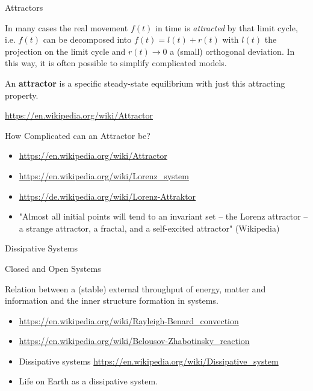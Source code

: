 \documentclass{beamer}
\begin{document}
\begin{frame}{Attractors}

In many cases the real movement $f(t)$ in time is \emph{attracted} by that
limit cycle, i.e. $f(t)$ can be decomposed into $f(t)=l(t)+r(t)$ with $l(t)$
the projection on the limit cycle and $r(t)\to 0$ a (small) orthogonal
deviation.  In this way, it is often possible to simplify complicated models.

An \textbf{attractor} is a specific steady-state equilibrium with just this
attracting property.

\url{https://en.wikipedia.org/wiki/Attractor}

\end{frame}

\begin{frame}{How Complicated can an Attractor be?}

\begin{itemize}
\item \url{https://en.wikipedia.org/wiki/Attractor}
\item \url{https://en.wikipedia.org/wiki/Lorenz_system}
\item \url{https://de.wikipedia.org/wiki/Lorenz-Attraktor}
\item "Almost all initial points will tend to an invariant set – the Lorenz
  attractor – a strange attractor, a fractal, and a self-excited attractor"
  (Wikipedia)
\end{itemize}

\end{frame}

\begin{frame}{Dissipative Systems}

  Closed and Open Systems

  Relation between a (stable) external throughput of energy, matter and
  information and the inner structure formation in systems.

  \begin{itemize}
  \item \url{https://en.wikipedia.org/wiki/Rayleigh-Benard_convection}
  \item \url{https://en.wikipedia.org/wiki/Belousov-Zhabotinsky_reaction}
  \item Dissipative systems
    \url{https://en.wikipedia.org/wiki/Dissipative_system} 
  \item Life on Earth as a dissipative system.
  \end{itemize}
\end{frame}
\end{document}
